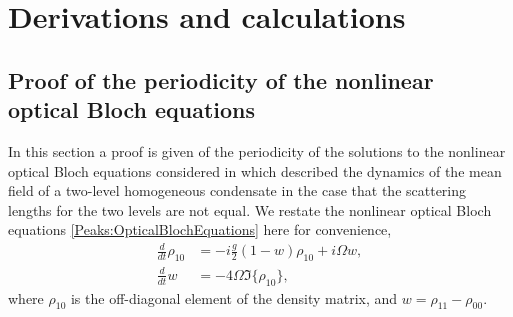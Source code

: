\chapter{Derivations and calculations}
\label{MethodsAppendix}
\graphicspath{{Figures/MethodsAppendix/}{Figures/Common/}}


\section{Proof of the periodicity of the nonlinear optical Bloch equations}
\label{MethodsAppendix:OpticalBlochPeriodicityProof}
In this section a proof is given of the periodicity of the solutions to the nonlinear optical Bloch equations considered in  which described the dynamics of the mean field of a two-level homogeneous condensate in the case that the scattering lengths for the two levels are not equal. We restate the nonlinear optical Bloch equations \eqref{Peaks:OpticalBlochEquations} here for convenience,
\begin{subequations}
    \label{MethodsAppendix:OpticalBlochEquations}
    \begin{align}
        \frac{d}{dt}\rho_{10} &= -i\frac{g}{2} (1-w)\rho_{10} + i \Omega w,\\
        \frac{d }{dt}w &= -4 \Omega \Im\{\rho_{10}\},
    \end{align}
\end{subequations}
where $\rho_{10}$ is the off-diagonal element of the density matrix, and $w = \rho_{11} - \rho_{00}$.


